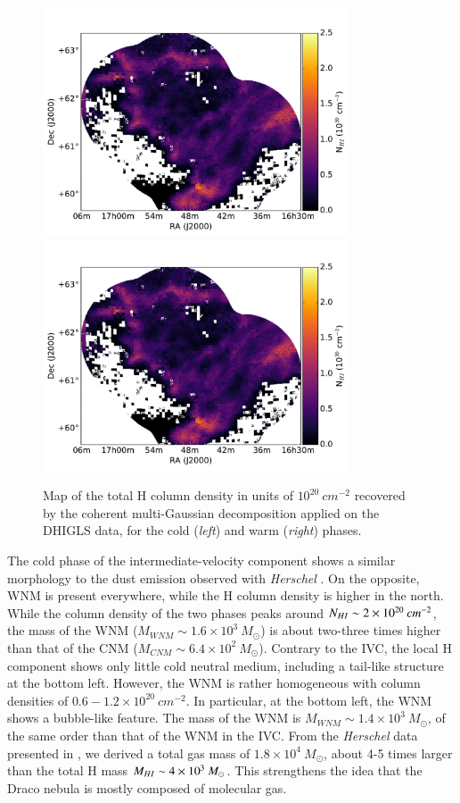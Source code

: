 \documentclass[traditabstract]{aa}
\begin{document}
\begin{figure}[h]
  \centering
  \includegraphics[page=3,height=6.8cm,trim=75 40 55 90,clip=true]{Figures/DHIGLS_NHI.pdf}
  \hspace{3mm}
  \includegraphics[page=6,height=6.8cm,trim=75 40 55 90,clip=true]{Figures/DHIGLS_NHI.pdf}
  \caption{\label{NHI_DHIGLS} Map of the total H column density in units of $10^{20}\: cm^{-2}$ recovered by the coherent multi-Gaussian decomposition applied on the DHIGLS data, for the cold (\emph{left}) and warm (\emph{right}) phases.}
\end{figure}

   The cold phase of the intermediate-velocity component shows a similar morphology to the dust emission observed with \emph{Herschel} \citep{MAMD_2017b}. On the opposite, WNM is present everywhere, while the H column density is higher in the north. While the column density of the two phases peaks around $N_{H\rmnum{1}}\sim 2\times 10^{20}\: cm^{-2}$, the mass of the WNM ($M_{WNM}\sim 1.6\times 10^3\: M_\odot$) is about two-three times higher than that of the CNM ($M_{CNM}\sim 6.4\times 10^2\: M_\odot$).
Contrary to the IVC, the local H component shows only little cold neutral medium, including a tail-like structure at the bottom left. However, the WNM is rather homogeneous with column densities of $0.6-1.2\times 10^{20}\: cm^{-2}$. In particular, at the bottom left, the WNM shows a bubble-like feature. The mass of the WNM is $M_{WNM}\sim 1.4\times 10^3\: M_\odot$, of the same order than that of the WNM in the IVC.
From the \emph{Herschel} data presented in \cite{MAMD_2017b}, we derived a total gas mass of $1.8\times 10^4\: M_\odot$, about 4-5 times larger than the total H mass $M_{H\rmnum{1}}\sim 4\times 10^3\: M_\odot$. This strengthens the idea that the Draco nebula is mostly composed of molecular gas.
\end{document}
